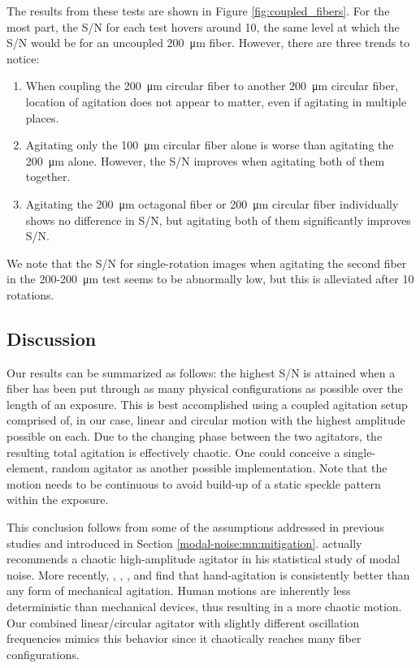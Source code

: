 The results from these tests are shown in Figure \ref{fig:coupled_fibers}. For the most part, the S/N for each test hovers around 10, the same level at which the S/N would be for an uncoupled \SI{200}{\micro\meter} fiber. However, there are three trends to notice:
\begin{enumerate}
\item When coupling the \SI{200}{\micro\meter} circular fiber to another \SI{200}{\micro\meter} circular fiber, location of agitation does not appear to matter, even if agitating in multiple places.
\item Agitating only the \SI{100}{\micro\meter} circular fiber alone is worse than agitating the \SI{200}{\micro\meter} alone. However, the S/N improves when agitating both of them together.
\item Agitating the \SI{200}{\micro\meter} octagonal fiber or \SI{200}{\micro\meter} circular fiber individually shows no difference in S/N, but agitating both of them significantly improves S/N.
\end{enumerate}
We note that the S/N for single-rotation images when agitating the second fiber in the 200-\SI{200}{\micro\meter} test seems to be abnormally low, but this is alleviated after 10 rotations.

\subsection{Discussion}
\label{modal-noise:results:discussion}

Our results can be summarized as follows: the highest S/N is attained when a fiber has been put through as many physical configurations as possible over the length of an exposure. This is best accomplished using a coupled agitation setup comprised of, in our case, linear and circular motion with the highest amplitude possible on each. Due to the changing phase between the two agitators, the resulting total agitation is effectively chaotic. One could conceive a single-element, random agitator as another possible implementation. Note that the motion needs to be continuous to avoid build-up of a static speckle pattern within the exposure.

This conclusion follows from some of the assumptions addressed in previous studies and introduced in Section \ref{modal-noise:mn:mitigation}. \citet{grupp_nature_2003} actually recommends a chaotic high-amplitude agitator in his statistical study of modal noise. More recently, \citet{lemke_modal_2011}, \citet{mccoy_optical_2012}, \citet{mahadevan_suppression_2014}, and \citet{roy_scrambling_2014} find that hand-agitation is consistently better than any form of mechanical agitation. Human motions are inherently less deterministic than mechanical devices, thus resulting in a more chaotic motion. Our combined linear/circular agitator with slightly different oscillation frequencies mimics this behavior since it chaotically reaches many fiber configurations.

